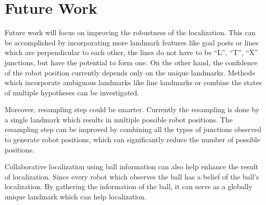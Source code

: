 \section{Future Work\label{sec:future}}
Future work will focus on improving the robustness of the localization. This can be accomplished by incorporating more landmark features like goal posts or lines which are perpendicular to each other, the lines do not have to be ``L'', ``T'', ``X'' junctions, but have the potential to form one. On the other hand, the confidence of the robot position currently depends only on the unique landmarks. Methods which incorporate ambiguous landmarks like line landmarks or combine the states of multiple hypotheses can be investigated.

Moreover, resampling step could be smarter. Currently the resampling is done by a single landmark which results in multiple possible robot positions. The resampling step can be improved by combining all the types of junctions observed to generate robot positions, which can significantly reduce the number of possible positions.


Collaborative localization using ball information can also help enhance the result of localization. Since every robot which observes the ball has a belief of the ball's localization. By gathering the information of the ball, it can serve as a globally unique landmark which can help localization.


